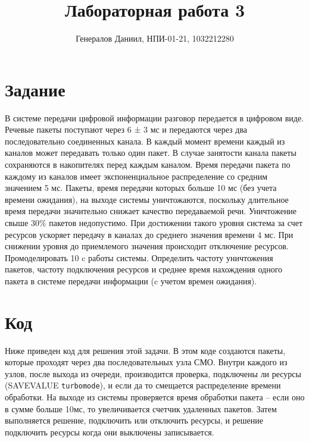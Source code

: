 \documentclass{article}
\title{Лабораторная работа 3}
\author{Генералов Даниил, НПИ-01-21, 1032212280}
\begin{document}
\maketitle

\section{Задание}

В системе передачи цифровой информации разговор передается в цифровом виде.
Речевые пакеты поступают через 6 ± 3 мс и передаются через два последовательно
соединенных канала. В каждый момент времени каждый из каналов может передавать
только один пакет. В случае занятости канала пакеты сохраняются в накопителях перед
каждым каналом. Время передачи пакета по каждому из каналов имеет экспоненциальное
распределение со средним значением 5 мс. Пакеты, время передачи которых больше 10 мс
(без учета времени ожидания), на выходе системы уничтожаются, поскольку длительное
время передачи значительно снижает качество передаваемой речи. Уничтожение свыше
30\% пакетов недопустимо. При достижении такого уровня система за счет ресурсов
ускоряет передачу в каналах до среднего значения времени 4 мс. При снижении уровня до
приемлемого значения происходит отключение ресурсов. Промоделировать 10 c работы
системы. Определить частоту уничтожения пакетов, частоту подключения ресурсов и
среднее время нахождения одного пакета в системе передачи информации (c учетом
времен ожидания).

\section{Код}

Ниже приведен код для решения этой задачи.
В этом коде создаются пакеты, которые проходят через два последовательных узла СМО.
Внутри каждого из узлов, после выхода из очереди, производится проверка, подключены ли ресурсы
(SAVEVALUE \texttt{turbomode}), и если да то смещается распределение времени обработки.
На выходе из системы проверяется время обработки пакета -- 
если оно в сумме больше 10мс, то увеличивается счетчик удаленных пакетов.
Затем выполняется решение, подключить или отключить ресурсы,
и решение подключить ресурсы когда они выключены записывается.



\end{document}
